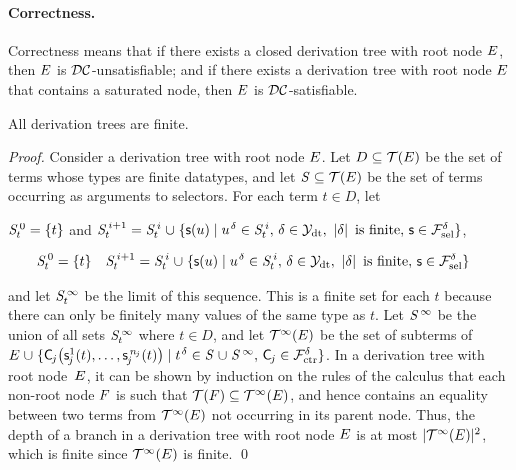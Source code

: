 \paragraph{Correctness.}
Correctness means that if there exists a closed derivation tree with root node
$E$, then $E$ is $\mathcal{DC}$-unsatisfiable; and if there exists
a derivation tree with root node $E$ that contains a saturated node, then
$E$ is $\mathcal{DC}$-satisfiable.

\begin{theorem}[Termination]%
\label{thm:t}%
\afterDot
All derivation trees are finite.
\end{theorem}
\begin{proof}
Consider a derivation tree with root node $E$. Let $D \subseteq \mathcal{T}(E)$ be the
set of terms whose types are finite datatypes, and let $\mathit{S} \subseteq \mathcal{T}(E)$ be
the set of terms occurring as arguments to selectors. For each term $t \in
D$\negvthinspace, let
\begin{conf}
$\smash{\mathit{S}^{\,0}_t} = \{ t \}$ and
$\smash{\SSSS {i+1}_t} = \smash{\SSSS i_t \mathrel\cup \{ \const s( u ) \mid u\typ{\delta} \in \SSSS i_t{,}}~\allowbreak\smash{ \delta \in \Data{,}~ \left|\delta\right| \text{ is finite}{,}~ \const{s} \in \Sel^{\delta}}  \}$,
\end{conf}%
\begin{rep}
\begin{align*}
\smash{\SSSS 0_t} & = \{ t \}
& \smash{\SSSS {i+1}_t} & = \smash{\SSSS i_t \mathrel\cup \{ \const s( u ) \mid u\typ{\delta} \in \SSSS i_t{,}~ \delta \in \Data{,}~ \left|\delta\right| \text{ is finite}{,}~ \const{s} \in \Sel^{\delta}}  \}
\end{align*}
\end{rep}%
and let $\mathit{S}^{\,\infty}_t$ be the limit of this sequence.
This is a finite set for each $t$ because there can only be finitely many
values of the same type as $t$.
Let $\mathit{S}^{\,\infty}$ be the union of all sets $\mathit{S}^{\,\infty}_t$ where $t \in D$,
and let $\mathcal{T}^\infty(E)$ be the set of subterms of
%
$\Ec \mathrel\cup \{ \const C_{\negvthinspace j}\bigl( \const s^1_{\negvthinspace j}( t ), \ldots, \const s^{\smash{\,n_{\negvthinspace j}}}_{\negvthinspace j}( t ) \bigr) \mid t\typ{\delta} \in \SSS \mathrel\cup \SSSS \AST{,}~ \const C_{\negvthinspace j} \in \Ctr^\delta \}$.
%
In a derivation tree with root node~$E$,
it can be shown by %
induction on the rules of the calculus that each non-root node $F$ is such that
$\mathcal{T}(F) \subseteq \mathcal{T}^\infty(E)$, and hence contains an equality between two terms from $\mathcal{T}^\infty(E)$ not occurring in its parent node.
Thus, the depth of a branch in a derivation tree with root node $E$ is at most $\left| \smash{\mathcal{T}^\infty(E)}\vphantom{X} \right|{\!}^2$,
which is finite since $\mathcal{T}^\infty(E)$ is finite.
\qed
\end{proof}

